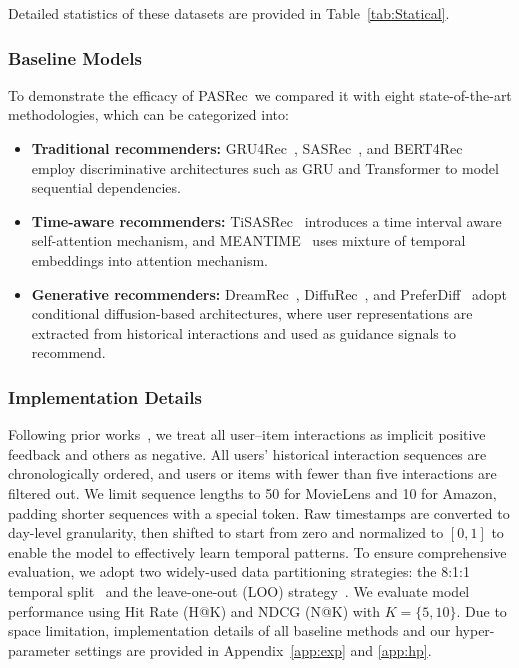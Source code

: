\documentclass[sigconf,nonacm]{acmart}
\newcommand{\modelname}{PASRec}
\begin{document}
Detailed statistics of these datasets are provided in Table~\ref{tab:Statical}.

\subsubsection{Baseline Models}

To demonstrate the efficacy of \modelname\, we compared it with eight state-of-the-art methodologies, which can be categorized into:

\begin{itemize}[leftmargin=*, labelsep=0.5em]
    \item \textbf{Traditional recommenders:} 
    GRU4Rec~\cite{hidasi2015session}, SASRec~\cite{kang2018self}, and BERT4Rec~\cite{sun2019bert4rec} employ discriminative architectures such as GRU and Transformer to model sequential dependencies.

    \item \textbf{Time-aware recommenders:} 
    TiSASRec~\cite{li2020time} introduces a time interval aware self-attention mechanism, and MEANTIME~\cite{cho2020meantime} uses mixture of temporal embeddings into attention mechanism.

    \item \textbf{Generative recommenders:} 
    DreamRec~\cite{hu2024generate}, DiffuRec~\cite{li2023diffurec}, and PreferDiff~\cite{liu2024preference} adopt conditional diffusion-based architectures, where user representations are extracted from historical interactions and used as guidance signals to recommend.
\end{itemize}


\subsubsection{Implementation Details}
Following prior works~\cite{kang2018self, li2023diffurec, liu2024preference}, we treat all user–item interactions as implicit positive feedback and others as negative. All users' historical interaction sequences are chronologically ordered, and users or items with fewer than five interactions are filtered out. We limit sequence lengths to 50 for MovieLens and 10 for Amazon, padding shorter sequences with a special token. Raw timestamps are converted to day-level granularity, then shifted to start from zero and normalized to $[0,1]$ to enable the model to effectively learn temporal patterns. To ensure comprehensive evaluation, we adopt two widely-used data partitioning strategies: the 8:1:1 temporal split~\cite{yang2023generate,liu2024preference} and the leave-one-out (LOO) strategy~\cite{kang2018self,sun2019bert4rec,li2023diffurec}. We evaluate model performance using Hit Rate (H@K) and NDCG (N@K) with \( K = \{5, 10\} \).
Due to space limitation, implementation details of all baseline methods and our hyper-parameter settings are provided in Appendix~\ref{app:exp} and \ref{app:hp}.
\end{document}
